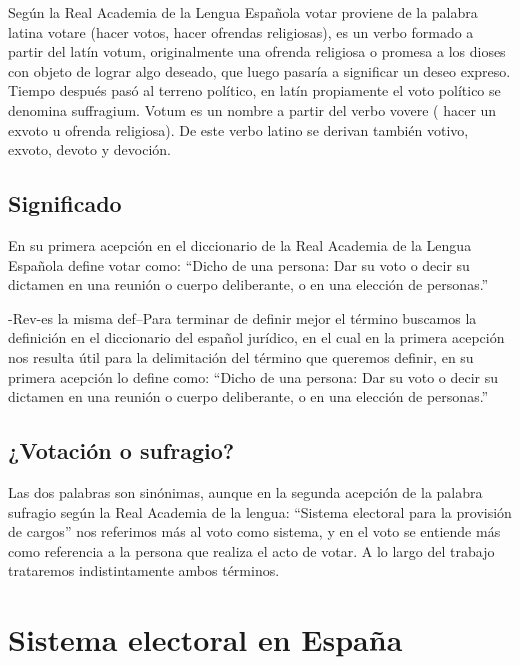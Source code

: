 \documentclass[12pt,a4paper,]{book}
\numberwithin{dummy}{section}
\theoremstyle{ocrenumbox}
\theoremstyle{blacknumex}
\theoremstyle{blacknumbox}
\theoremstyle{ocrenum}
\theoremstyle{ocrenum}
\begin{document}
Según la Real Academia de la Lengua Española votar proviene de la
palabra latina votare (hacer votos, hacer ofrendas religiosas), es un
verbo formado a partir del latín votum, originalmente una ofrenda
religiosa o promesa a los dioses con objeto de lograr algo deseado, que
luego pasaría a significar un deseo expreso. Tiempo después pasó al
terreno político, en latín propiamente el voto político se denomina
suffragium. Votum es un nombre a partir del verbo vovere ( hacer un
exvoto u ofrenda religiosa). De este verbo latino se derivan también
votivo, exvoto, devoto y devoción.

\hypertarget{significado}{%
\subsection{Significado}\label{significado}}

En su primera acepción en el diccionario de la Real Academia de la
Lengua Española define votar como: ``Dicho de una persona: Dar su voto o
decir su dictamen en una reunión o cuerpo deliberante, o en una elección
de personas.''

-Rev-es la misma def--Para terminar de definir mejor el término buscamos
la definición en el diccionario del español jurídico, en el cual en la
primera acepción nos resulta útil para la delimitación del término que
queremos definir, en su primera acepción lo define como: ``Dicho de una
persona: Dar su voto o decir su dictamen en una reunión o cuerpo
deliberante, o en una elección de personas.''

\hypertarget{votaciuxf3n-o-sufragio}{%
\subsection{¿Votación o sufragio?}\label{votaciuxf3n-o-sufragio}}

Las dos palabras son sinónimas, aunque en la segunda acepción de la
palabra sufragio según la Real Academia de la lengua: ``Sistema
electoral para la provisión de cargos'' nos referimos más al voto como
sistema, y en el voto se entiende más como referencia a la persona que
realiza el acto de votar. A lo largo del trabajo trataremos
indistintamente ambos términos.

\hypertarget{sistema-electoral-en-espauxf1a}{%
\section{Sistema electoral en
España}\label{sistema-electoral-en-espauxf1a}}
\end{document}
